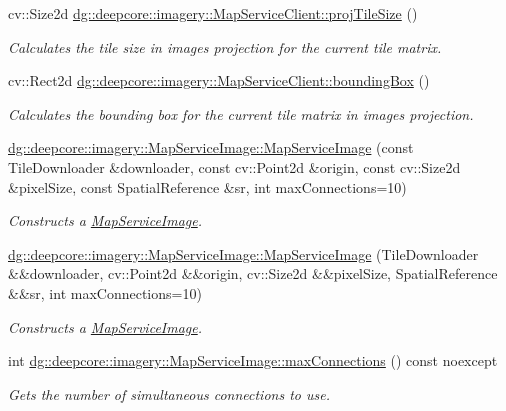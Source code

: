 \begin{DoxyCompactItemize}
cv\+::\+Size2d \hyperlink{group___imagery_module_gab51c76e17b6432742a0eeb0d34fa21f1}{dg\+::deepcore\+::imagery\+::\+Map\+Service\+Client\+::proj\+Tile\+Size} ()
\begin{DoxyCompactList}\small\item\em Calculates the tile size in image\textquotesingle{}s projection for the current tile matrix. \end{DoxyCompactList}\item 
cv\+::\+Rect2d \hyperlink{group___imagery_module_gad1f4f578c9e222b4cd709e9c2d370bb6}{dg\+::deepcore\+::imagery\+::\+Map\+Service\+Client\+::bounding\+Box} ()
\begin{DoxyCompactList}\small\item\em Calculates the bounding box for the current tile matrix in image\textquotesingle{}s projection. \end{DoxyCompactList}\item 
\hyperlink{group___imagery_module_gacf8dbc680dc88bda0c9b8f289b659be4}{dg\+::deepcore\+::imagery\+::\+Map\+Service\+Image\+::\+Map\+Service\+Image} (const Tile\+Downloader \&downloader, const cv\+::\+Point2d \&origin, const cv\+::\+Size2d \&pixel\+Size, const Spatial\+Reference \&sr, int max\+Connections=10)
\begin{DoxyCompactList}\small\item\em Constructs a \hyperlink{classdg_1_1deepcore_1_1imagery_1_1_map_service_image}{Map\+Service\+Image}. \end{DoxyCompactList}\item 
\hyperlink{group___imagery_module_gab2e2d296871f5372c45b2c4f55a9120c}{dg\+::deepcore\+::imagery\+::\+Map\+Service\+Image\+::\+Map\+Service\+Image} (Tile\+Downloader \&\&downloader, cv\+::\+Point2d \&\&origin, cv\+::\+Size2d \&\&pixel\+Size, Spatial\+Reference \&\&sr, int max\+Connections=10)
\begin{DoxyCompactList}\small\item\em Constructs a \hyperlink{classdg_1_1deepcore_1_1imagery_1_1_map_service_image}{Map\+Service\+Image}. \end{DoxyCompactList}\item 
int \hyperlink{group___imagery_module_ga1774c7d4c06c8e18a98db65b088b19b9}{dg\+::deepcore\+::imagery\+::\+Map\+Service\+Image\+::max\+Connections} () const noexcept
\begin{DoxyCompactList}\small\item\em Gets the number of simultaneous connections to use. \end{DoxyCompactList}\item 

\end{DoxyCompactItemize}
